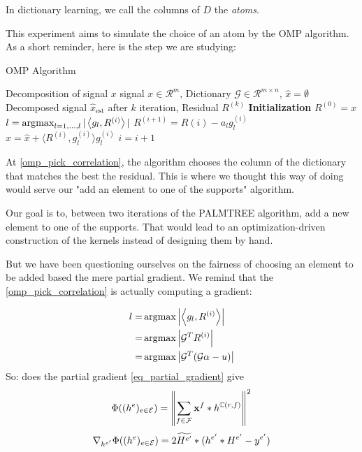 In dictionary learning, we call the columns of $D$ the \emph{atoms}.


This experiment aims to simulate the choice of an atom by the OMP algorithm. As a short reminder, here is the step we are studying:
\begin{algorithm}
    \caption{OMP Algorithm}
  \begin{algorithmic}[1]
    \Require Decomposition of signal $x$
    \Input signal $x \in \mathcal{R}^{m}$, Dictionary $\mathcal{G} \in \mathcal{R}^{m \times n}$, $\hat{x} = \emptyset$
    \Output Decomposed signal $\hat{x}_{\text{est}}$ after $k$ iteration, Residual $R^{(k)}$
    \State \textbf{Initialization} $R^{(0)} = x$
      \State $l =  \operatorname*{\arg\!\max}_{l = 1,\dots,l} |\left< g_l,R^{(i)} \right>|$ \label{omp_pick_correlation}
      \State $R^{(i+1)} = R{(i)}-a_l g_l^{(i)}$
      \State $\hat{x} = \hat{x}+\langle R^{(i)}, g_{l}^{(i)} \rangle g_{l}^{(i)}$
      \State $i = i + 1$
    \EndWhile
  \end{algorithmic}
\end{algorithm}

At \cref{omp_pick_correlation}, the algorithm chooses the column of the dictionary that matches the best the residual. This is where we thought this way of doing would serve our "add an element to one of the supports" algorithm.

Our goal is to, between two iterations of the PALMTREE algorithm, add a new element to one of the supports. That would lead to an optimization-driven construction of the kernels instead of designing them by hand.

But we have been questioning ourselves on the fairness of choosing an element to be added based the mere partial gradient. We remind that the \ref{omp_pick_correlation} is actually computing a gradient:

\begin{align*}
l =& \operatorname*{\arg\!\max} \left|\left< g_l,R^{(i)} \right>\right| \\
=& \operatorname*{\arg\!\max} \left| \mathcal{G}^TR^{(i)}\right| \\
=& \operatorname*{\arg\!\max} \left| \mathcal{G}^T(\mathcal{G}\alpha - u)\right| \\
\end{align*}
So: does the partial gradient \ref{eq_partial_gradient} give 
\begin{align*}
\Phi((h^e)_{e \in \mathcal E}) = \left\| \sum_{f\in\mathcal F} \mathbf x^f * h^{\mathbb C(r,f)} \right\|^2
\end{align*}
\begin{align*} 
\nabla_{h^{e'}}\Phi((h^e)_{e \in \mathcal E}) = 2 \widetilde{H^{e'}} * (h^{e'}*H^{e'}-y^{e'})
\end{align*} \label{eq_partial_gradient}






